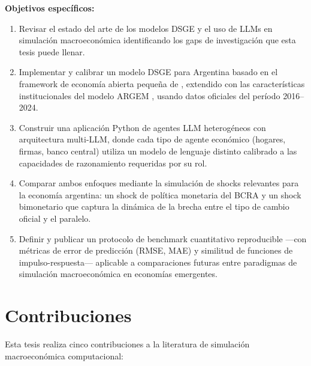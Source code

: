 \noindent\textbf{Objetivos específicos:}

\begin{enumerate}
    \item Revisar el estado del arte de los modelos DSGE y el uso de LLMs en simulación macroeconómica
    identificando los gaps de investigación que esta tesis puede llenar.

    \item Implementar y calibrar un modelo DSGE para Argentina basado en el framework
    de economía abierta pequeña de \citet{GaliMonacelli2005}, extendido con las
    características institucionales del modelo ARGEM \citep{EscudeARGEM2007}, usando datos
    oficiales del período 2016--2024.

    \item Construir una aplicación Python de agentes LLM heterogéneos con arquitectura
    multi-LLM, donde cada tipo de agente económico (hogares, firmas, banco central) utiliza
    un modelo de lenguaje distinto calibrado a las capacidades de razonamiento requeridas
    por su rol.

    \item Comparar ambos enfoques mediante la simulación de shocks relevantes para la
    economía argentina: un shock de política monetaria del BCRA y un shock bimonetario
    que captura la dinámica de la brecha entre el tipo de cambio oficial y el paralelo.

    \item Definir y publicar un protocolo de benchmark cuantitativo reproducible ---con
    métricas de error de predicción (RMSE, MAE) y similitud de funciones de
    impulso-respuesta--- aplicable a comparaciones futuras entre paradigmas de simulación
    macroeconómica en economías emergentes.
\end{enumerate}

\section{Contribuciones}
\label{sec:contribuciones}

Esta tesis realiza cinco contribuciones a la literatura de simulación macroeconómica
computacional:

